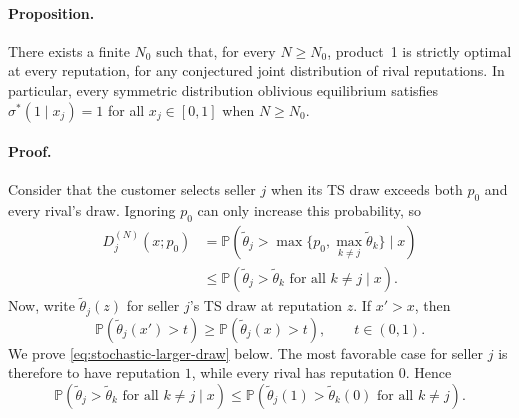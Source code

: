 \documentclass[11pt]{article}
\newcommand{\Pb}{\mathbb P}
\begin{document}
\paragraph{Proposition.}
There exists a finite $N_0$ such that, for every $N\geq N_0$, product~1
is strictly optimal at every reputation, for any conjectured joint
distribution of rival reputations. In particular, every symmetric
distribution oblivious equilibrium satisfies
$\sigma^*(1\mid x_j)=1$ for all $x_j\in[0,1]$ when $N\geq N_0$.

\paragraph{Proof.}
Consider that the customer selects seller $j$ when its TS draw exceeds
both $p_0$ and every rival's draw. Ignoring $p_0$ can only increase this
probability, so
\begin{equation}
\begin{aligned}
D_j^{(N)}(x;p_0)
&=\Pb\!\left(
\widetilde\theta_j>\max\{p_0,\max_{k\neq j}\widetilde\theta_k\}
\mid x\right)\\
&\leq\Pb(\widetilde\theta_j>\widetilde\theta_k
\text{ for all }k\neq j\mid x).
\end{aligned}
\end{equation}
Now, write $\widetilde\theta_j(z)$ for seller $j$'s TS draw at reputation
$z$. If $x'>x$, then
\begingroup
\renewcommand{\theHequation}{stochastic-larger-draw}
\begin{equation}
\Pb(\widetilde\theta_j(x')>t)
\geq\Pb(\widetilde\theta_j(x)>t),
\qquad t\in(0,1).
\tag{*}\label{eq:stochastic-larger-draw}
\end{equation}
\endgroup
We prove \eqref{eq:stochastic-larger-draw} below. The most favorable case
for seller $j$ is therefore to have reputation $1$, while every rival
has reputation $0$. Hence
\begin{equation}
\Pb(\widetilde\theta_j>\widetilde\theta_k
\text{ for all }k\neq j\mid x)
\leq\Pb(\widetilde\theta_j(1)>\widetilde\theta_k(0)
\text{ for all }k\neq j).
\end{equation}
\end{document}
